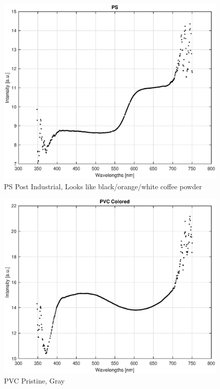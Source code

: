 \begin{appendices}
\begin{figure}
    \centering
    \includegraphics[width = 12cm]{Images/appendix/ps-postindust.eps}
    \caption[$\; \:$PS Post Industrial]{PS Post Industrial, Looks like black/orange/white coffee powder}
    \label{fig:ps-coffee}
\end{figure}

\begin{figure}
    \centering
    \includegraphics[width = 12cm]{Images/appendix/pvc-pristine-colored.eps}
    \caption[$\; \:$PVC Pristine]{PVC Pristine, Gray}
    \label{fig:pvc-gray}
\end{figure}


\end{appendices}
